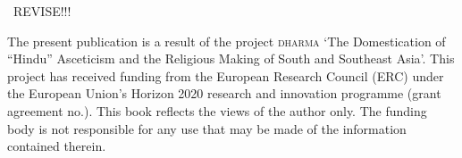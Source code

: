 \vfill
\pagebreak

\noindent

\CHECK\ REVISE!!!

{\footnotesize
The present publication is a result of the project \textsc{dharma} `The
Domestication of ``Hindu'' Asceticism and the Religious Making of South and Southeast Asia'.  This project has received funding from the European Research Council (ERC) under the European Union's Horizon 2020 research and innovation programme (grant agreement no.).  This book reflects the views of the author only.  The funding body is not responsible for any use that
may be made of the information contained therein.}


\vfill
\pagebreak

